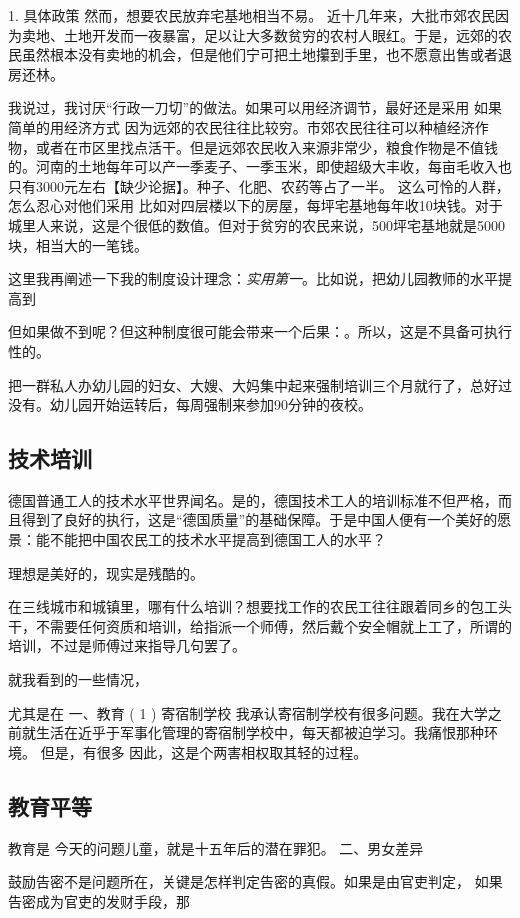 1. 具体政策
然而，想要农民放弃宅基地相当不易。
近十几年来，大批市郊农民因为卖地、土地开发而一夜暴富，足以让大多数贫穷的农村人眼红。于是，远郊的农民虽然根本没有卖地的机会，但是他们宁可把土地攥到手里，也不愿意出售或者退房还林。

我说过，我讨厌“行政一刀切”的做法。如果可以用经济调节，最好还是采用
如果简单的用经济方式
因为远郊的农民往往比较穷。市郊农民往往可以种植经济作物，或者在市区里找点活干。但是远郊农民收入来源非常少，粮食作物是不值钱的。河南的土地每年可以产一季麦子、一季玉米，即使超级大丰收，每亩毛收入也只有3000元左右【缺少论据】。种子、化肥、农药等占了一半。
这么可怜的人群，怎么忍心对他们采用
比如对四层楼以下的房屋，每坪宅基地每年收10块钱。对于城里人来说，这是个很低的数值。但对于贫穷的农民来说，500坪宅基地就是5000块，相当大的一笔钱。

这里我再阐述一下我的制度设计理念：\textit{实用第一}。比如说，把幼儿园教师的水平提高到

但如果做不到呢？但这种制度很可能会带来一个后果：。所以，这是不具备可执行性的。

把一群私人办幼儿园的妇女、大嫂、大妈集中起来强制培训三个月就行了，总好过没有。幼儿园开始运转后，每周强制来参加90分钟的夜校。

\subsection{技术培训}
德国普通工人的技术水平世界闻名。是的，德国技术工人的培训标准不但严格，而且得到了良好的执行，这是“德国质量”的基础保障。于是中国人便有一个美好的愿景：能不能把中国农民工的技术水平提高到德国工人的水平？

理想是美好的，现实是残酷的。

在三线城市和城镇里，哪有什么培训？想要找工作的农民工往往跟着同乡的包工头干，不需要任何资质和培训，给指派一个师傅，然后戴个安全帽就上工了，所谓的培训，不过是师傅过来指导几句罢了。

就我看到的一些情况，

尤其是在
一、教育
( 1 ) 寄宿制学校
我承认寄宿制学校有很多问题。我在大学之前就生活在近乎于军事化管理的寄宿制学校中，每天都被迫学习。我痛恨那种环境。
但是，有很多
因此，这是个两害相权取其轻的过程。

\subsection{教育平等}

教育是
今天的问题儿童，就是十五年后的潜在罪犯。
二、男女差异


鼓励告密不是问题所在，关键是怎样判定告密的真假。如果是由官吏判定，
如果告密成为官吏的发财手段，那
